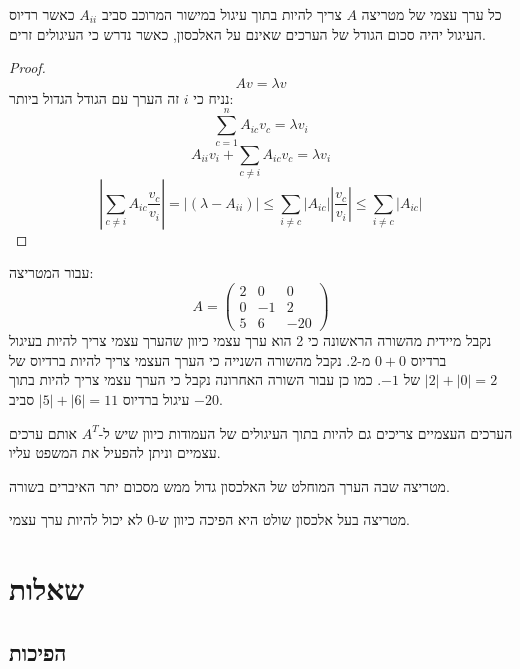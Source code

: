 \documentclass{tstextbook}
\begin{document}
\begin{proposition}
כל ערך עצמי של מטריצה \(A\) צריך להיות בתוך עיגול במישור המרוכב סביב \(A_{i i}\) כאשר רדיוס העיגול יהיה סכום הגודל של הערכים שאינם על האלכסון, כאשר נדרש כי העיגולים זרים.

\end{proposition}
\begin{proof}
$$Av=\lambda v$$
נניח כי \(i\) זה הערך עם הגודל הגדול ביותר:
$$\sum_{c=1}^{n} A_{i c}v_{c}=\lambda v_{i}$$$$A_{i i}v_{i}+\sum_{c\neq i} A_{ic} v_{c} = \lambda v_{i}$$$$\left\lvert  \sum_{c\neq i} A_{i c} \frac{v_{c}}{v_{i}}  \right\rvert =\left\lvert  \left( \lambda- A_{ii} \right)  \right\rvert \leq \sum_{i \neq c} \lvert A_{i c} \rvert \left\lvert  \frac{v_{c}}{v_{i}}  \right\rvert \leq \sum_{i\neq c} \lvert A_{i c} \rvert  $$

\end{proof}
\begin{example}
עבור המטריצה:
$$A=\begin{pmatrix}2 & 0 &  0 \\0 & -1 & 2 \\5 & 6 & -20
\end{pmatrix}$$
נקבל מיידית מהשורה הראשונה כי 2 הוא ערך עצמי כיוון שהערך עצמי צריך להיות בעיגול ברדיוס \(0+0\) מ-2. נקבל מהשורה השנייה כי הערך העצמי צריך להיות ברדיוס של \(|2|+|0|=2\) של \(-1\). כמו כן עבור השורה האחרונה נקבל כי הערך עצמי צריך להיות בתוך עיגול ברדיוס \(|5|+|6|=11\) סביב \(-20\).

\end{example}
\begin{corollary}
הערכים העצמיים צריכים גם להיות בתוך העיגולים של העמודות כיוון שיש ל-\(A^{T}\) אותם ערכים עצמיים וניתן להפעיל את המשפט עליו.

\end{corollary}
\begin{definition}
מטריצה שבה הערך המוחלט של האלכסון גדול ממש מסכום יתר האיברים בשורה.

\end{definition}
\begin{corollary}
מטריצה בעל אלכסון שולט היא הפיכה כיוון ש-0 לא יכול להיות ערך עצמי.

\end{corollary}
\chapter{שאלות}

\section{הפיכות}
\end{document}

